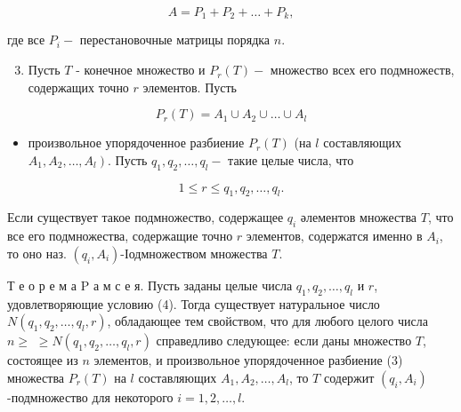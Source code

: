 \documentclass[10pt]{article}
\begin{document}
\[

A=P_{1}+P_{2}+\ldots+P_{k},

\]



где все $P_{i}-$ перестановочные матрицы порядка $n$.



\begin{enumerate}

  \setcounter{enumi}{2}

  \item Пусть $T$ - конечное множество и $P_{r}(T)-$ множество всех его подмножеств, содержащих точно $r$ элементов. Пусть

\end{enumerate}



\[

P_{r}(T)=A_{1} \cup A_{2} \cup \ldots \cup A_{l}

\]



\begin{itemize}

  \item произвольное упорядоченное разбиение $P_{r}(T)$ (на $l$ составляющих $\left.A_{1}, A_{2}, \ldots, A_{l}\right)$. Пусть $q_{1}, q_{2}, \ldots, q_{l}-$ такие целые числа, что

\end{itemize}



\[

1 \leqslant r \leqslant q_{1}, q_{2}, \ldots, q_{l} .

\]



Если существует такое подмножество, содержащее $q_{i}$ әлементов множества $T$, что все его подмножества, содержащие точно $r$ элементов, содержатся именно в $A_{i}$, то оно наз. $\left(q_{i}, A_{i}\right)$-Іодмножеством множества $T$.



Т е о р е м а $\mathrm{P}$ а м с е я. Пусть заданы целые числа $q_{1}, q_{2}, \ldots, q_{l}$ и $r$, удовлетворяющие условию (4). Тогда существует натуральное число $N\left(q_{1}, q_{2}, \ldots, q_{l}, r\right)$, обладающее тем свойством, что для любого целого числа $n \geqslant$ $\geqslant N\left(q_{1}, q_{2}, \ldots, q_{l}, r\right)$ справедливо следующее: если даны множество $T$, состоящее из $n$ элементов, и произвольное упорядоченное разбиение (3) множества $P_{r}(T)$ на $l$ составляющих $A_{1}, A_{2}, \ldots, A_{l}$, то $T$ содержит $\left(q_{i}, A_{i}\right)$-подмножество для некоторого $i=1,2, \ldots, l$.
\end{document}
